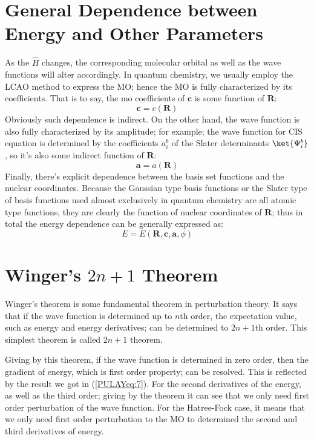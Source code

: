 \section{General Dependence between Energy and Other
Parameters}\label{General_dependence_gradient}
%
%
%
%
As the $\hat{H}$ changes, the corresponding molecular orbital as well as the
wave functions will alter accordingly. In quantum chemistry, we usually employ
the LCAO method to express the MO; hence the MO is fully characterized by its
coefficients. That is to say, the mo coefficients of $\bm{c}$ is some function
of $\bm{R}$:
\begin{equation}
 \label{GD_gradient_eq:4}
\bm{c} = c(\bm{R})
\end{equation}
Obviously such dependence is indirect. On the other hand, the wave function is
also fully characterized by its amplitude; for example; the wave function for
CIS equation is determined by the coefficients $a_{i}^{b}$ of the Slater
determinants $\ket{\Psi_{i}^{b}}$, so it's also some indirect function of
$\bm{R}$:
\begin{equation}
\label{GD_gradient_eq:5}
 \bm{a} = a(\bm{R})
\end{equation}
Finally, there's explicit dependence between the basis set functions and the
nuclear coordinates. Because the Gaussian type basis functions or the
Slater type of basis functions used almost exclusively in quantum chemistry are
all atomic type functions, they are clearly the function of nuclear coordinates
of $\bm{R}$; thus in total the energy dependence can be generally expressed as:
\begin{equation}
 \label{GD_gradient_eq:6}
E = E(\bm{R}, \bm{c}, \bm{a}, \phi)
\end{equation}
 
\section{Winger's $2n+1$ Theorem}
\label{Winger_theorem}
%
%
%
Winger's theorem is some fundamental theorem in perturbation theory. It says
that if the wave function is determined up to $n$th order, the expectation
value, such as energy and energy derivatives; can be determined to $2n+1$th
order. This simplest theorem is called $2n+1$ theorem.

Giving by this theorem, if the wave function is determined in zero order, then
the gradient of energy, which is first order property; can be resolved. This is
reflected by the result we got in (\ref{PULAYeq:7}). For the second derivatives
of the energy, as well as the third order; giving by the theorem it can see
that we only need first order perturbation of the wave function. For the
Hatree-Fock case, it means that we only need first order perturbation to the MO
to determined the second and third derivatives of energy.


